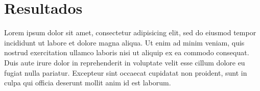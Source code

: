 \section{Resultados} \label{sec-results}


Lorem ipsum dolor sit amet, consectetur adipisicing elit, sed do eiusmod
tempor incididunt ut labore et dolore magna aliqua. Ut enim ad minim veniam,
quis nostrud exercitation ullamco laboris nisi ut aliquip ex ea commodo
consequat. Duis aute irure dolor in reprehenderit in voluptate velit esse
cillum dolore eu fugiat nulla pariatur. Excepteur sint occaecat cupidatat non
proident, sunt in culpa qui officia deserunt mollit anim id est laborum.